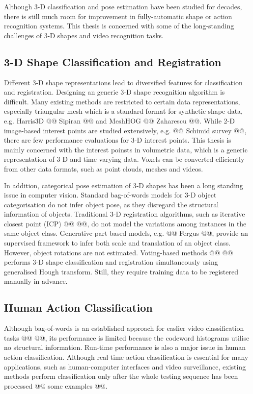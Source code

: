 Although 3-D classification and pose estimation have been studied for decades, there is still much room for improvement in fully-automatic shape or action recognition systems. 
This thesis is concerned with some of the long-standing challenges of 3-D shapes and video recognition tasks.  

\subsection{3-D Shape Classification and Registration} 

Different 3-D shape representations lead to diversified features for classification and registration. Designing an generic 3-D shape recognition algorithm is difficult. Many existing methods are restricted to certain data representations, especially triangular mesh which is a standard format for synthetic shape data, e.g. Harris3D @@ Sipiran @@ and MeshHOG @@ Zaharescu @@.     
While 2-D image-based interest points are studied extensively, e.g. @@ Schimid survey @@, there are few performance evaluations for 3-D interest points. 
This thesis is mainly concerned with the interest poinsts in volumetric data, which is a generic representation of 3-D and time-varying data. Voxels can be converted efficiently from other data formats, such as point clouds, meshes and videos. 

In addition, categorical pose estimation of 3-D shapes has been a long standing issue in computer vision.
Standard bag-of-words models for 3-D object categorisation do not infer object pose, as they disregard the structural information of objects. Traditional 3-D registration algorithms, such as iterative closest point (ICP) @@ @@, do not model the variations among instances in the same object class. 
Generative part-based models, e.g. @@ Fergus @@, provide an supervised framework to infer both scale and translation of an object class. However, object rotations are not estimated.   
Voting-based methods @@ @@ performs 3-D shape classification and registration simultaneously using generalised Hough transform. Still, they require training data to be registered manually in advance.  

\subsection{Human Action Classification}


Although bag-of-words is an established approach for easlier video classification tasks @@ @@, its performance is limited because the codeword histograms utilise no structural information. Run-time performance is also a major issue in human action classification. Although real-time action classification is essential for many applications, such as human-computer interfaces and video surveillance, existing methods perform classification only after the whole testing sequence has been processed @@ some examples @@. 

